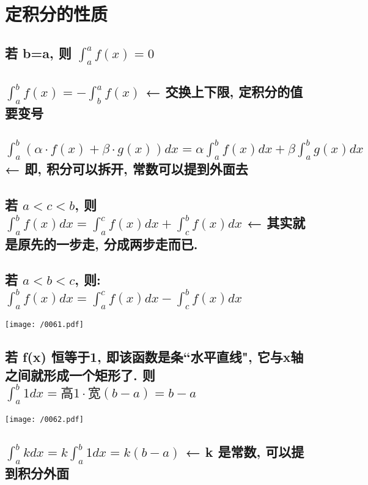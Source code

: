 \documentclass[UTF8]{ctexart}
\begin{document}
	
	
	
	
	\section{定积分的性质}
	
	\subsection{若 b=a, 则 $ \int_a^a f(x) = 0$}
	
	\subsection{$ \int_a^b f(x) = -  \int_b^a f(x)$  ← 交换上下限, 定积分的值要变号}
	
	\subsection{$\int_a^b (\alpha \cdot f(x) + \beta \cdot g(x)) dx = \alpha \int_a^b  f(x) dx + \beta \int_a^b  g(x) dx$ ← 即, 积分可以拆开, 常数可以提到外面去}
	
	\subsection{ 若 $ a < c < b$, 则 $ \int_a^b f(x) dx = \int_a^c f(x) dx + \int_c^b f(x) dx $ ← 其实就是原先的一步走, 分成两步走而已.}
	
	
	\subsection{ 若 $ a < b < c$, 则: $ \int_a^b f(x) dx = \int_a^c f(x) dx - \int_c^b f(x) dx$} 
	
	\texttt{[image: /0061.pdf]}
	
	
	
	\subsection{若 f(x) 恒等于1, 即该函数是条``水平直线", 它与x轴之间就形成一个矩形了. 则 $ \int_a^b 1 dx = \text{高}1 \cdot \text{宽}(b-a) = b-a$}
	
	\texttt{[image: /0062.pdf]}	
	
	
	\subsection{$\int_a^b k dx = k  \int_a^b 1 dx =  k(b-a) $ ← k 是常数, 可以提到积分外面}
	
\end{document}
